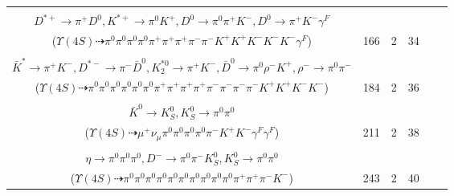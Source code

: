 \documentclass[landscape]{article}
\newcounter{rownumbers}
\newcommand\rn{\stepcounter{rownumbers}\arabic{rownumbers}}
\newcommand{\EOLP}{\\ \hline} %
\newcommand{\topoTags}[1]{#1} %
\begin{document}
\begin{longtable}{clcccc}
\rn & \makecell[l]{ $ 
\Upsilon(4S) \rightarrow B^{0} \bar{B}^{0} ,
B^{0} \rightarrow K^{+} D^{-} D^{*0} ,
\bar{B}^{0} \rightarrow \rho^{-} D^{*+} ,
D^{-} \rightarrow \pi^{-} K^{-} K^{*+} ,
D^{*0} \rightarrow \pi^{0} D^{0} ,
\rho^{-} \rightarrow \pi^{0} \pi^{-} ,
$ \\ $
D^{*+} \rightarrow \pi^{+} D^{0} ,
K^{*+} \rightarrow \pi^{0} K^{+} ,
D^{0} \rightarrow \pi^{0} \pi^{+} K^{-} ,
D^{0} \rightarrow \pi^{+} K^{-} \gamma^{F} 
$ \\ ($
\Upsilon(4S) \dashrightarrow \pi^{0} \pi^{0} \pi^{0} \pi^{0} \pi^{+} \pi^{+} \pi^{+} \pi^{-} \pi^{-} K^{+} K^{+} K^{-} K^{-} K^{-} \gamma^{F} 
$) } & \topoTags{166 & }2 & 34 \EOLP

\rn & \makecell[l]{ $ 
\Upsilon(4S) \rightarrow B^{0} \bar{B}^{0} ,
B^{0} \rightarrow \pi^{0} \rho^{+} \omega K^{*} \bar{K}^{*} D^{*-} ,
\bar{B}^{0} \rightarrow \pi^{0} K_2^{*0} ,
\rho^{+} \rightarrow \pi^{0} \pi^{+} ,
\omega \rightarrow \pi^{0} \pi^{+} \pi^{-} ,
K^{*} \rightarrow \pi^{-} K^{+} ,
$ \\ $
\bar{K}^{*} \rightarrow \pi^{+} K^{-} ,
D^{*-} \rightarrow \pi^{-} \bar{D}^{0} ,
K_2^{*0} \rightarrow \pi^{+} K^{-} ,
\bar{D}^{0} \rightarrow \pi^{0} \rho^{-} K^{+} ,
\rho^{-} \rightarrow \pi^{0} \pi^{-} 
$ \\ ($
\Upsilon(4S) \dashrightarrow \pi^{0} \pi^{0} \pi^{0} \pi^{0} \pi^{0} \pi^{0} \pi^{+} \pi^{+} \pi^{+} \pi^{+} \pi^{-} \pi^{-} \pi^{-} \pi^{-} K^{+} K^{+} K^{-} K^{-} 
$) } & \topoTags{184 & }2 & 36 \EOLP

\rn & \makecell[l]{ $ 
\Upsilon(4S) \rightarrow \bar{B}^{0} \bar{B}^{0} ,
\bar{B}^{0} \rightarrow K^{+} K_{0}^{*-} ,
\bar{B}^{0} \rightarrow \pi^{-} D^{*+} \gamma^{F} \gamma^{F} ,
K_{0}^{*-} \rightarrow \pi^{0} K^{-} ,
D^{*+} \rightarrow \pi^{0} D^{+} ,
D^{+} \rightarrow \mu^{+} \nu_{\mu} \bar{K}^{0} ,
$ \\ $
\bar{K}^{0} \rightarrow K_{S}^{0} ,
K_{S}^{0} \rightarrow \pi^{0} \pi^{0} 
$ \\ ($
\Upsilon(4S) \dashrightarrow \mu^{+} \nu_{\mu} \pi^{0} \pi^{0} \pi^{0} \pi^{0} \pi^{-} K^{+} K^{-} \gamma^{F} \gamma^{F} 
$) } & \topoTags{211 & }2 & 38 \EOLP

\rn & \makecell[l]{ $ 
\Upsilon(4S) \rightarrow B^{0} \bar{B}^{0} ,
B^{0} \rightarrow \pi^{+} \eta^{\prime} D^{*-} ,
\bar{B}^{0} \rightarrow \pi^{+} K_{0}^{*-} ,
\eta^{\prime} \rightarrow \pi^{0} \pi^{0} \eta ,
D^{*-} \rightarrow \pi^{0} D^{-} ,
K_{0}^{*-} \rightarrow \pi^{0} K^{-} ,
$ \\ $
\eta \rightarrow \pi^{0} \pi^{0} \pi^{0} ,
D^{-} \rightarrow \pi^{0} \pi^{-} K_{S}^{0} ,
K_{S}^{0} \rightarrow \pi^{0} \pi^{0} 
$ \\ ($
\Upsilon(4S) \dashrightarrow \pi^{0} \pi^{0} \pi^{0} \pi^{0} \pi^{0} \pi^{0} \pi^{0} \pi^{0} \pi^{0} \pi^{0} \pi^{+} \pi^{+} \pi^{-} K^{-} 
$) } & \topoTags{243 & }2 & 40 \EOLP


\end{longtable}
\end{document}
